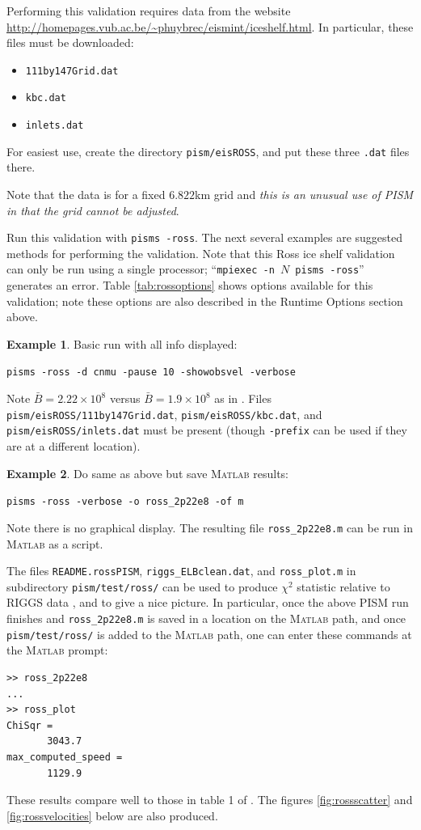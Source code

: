 \documentclass[11pt,final]{amsart}
\newcommand{\Matlab}{\textsc{Matlab}\xspace}
\begin{document}
Performing this validation requires data from the website \url{http://homepages.vub.ac.be/~phuybrec/eismint/iceshelf.html}.  In particular, these files must be downloaded:
\begin{itemize}
\item \verb|111by147Grid.dat|
\item \verb|kbc.dat|
\item \verb|inlets.dat|
\end{itemize}
For easiest use, create the directory \verb|pism/eisROSS|, and put these three \verb|.dat| files there.

Note that the data is for a fixed $6.822$km grid and \emph{this is an unusual use of PISM in that the grid cannot be adjusted}.

Run this validation with \verb|pisms -ross|.  The next several examples are suggested methods for performing the validation.  Note that this Ross ice shelf validation can only be run using a single processor; ``\verb|mpiexec -n |$N$\verb| pisms -ross|'' generates an error.  Table \ref{tab:rossoptions} shows options available for this validation; note these options are also described in the Runtime Options section above.

\bigskip
\noindent\textbf{Example 1}.  Basic run with all info displayed: 

\verb|pisms -ross -d cnmu -pause 10 -showobsvel -verbose|

\noindent Note $\bar B = 2.22 \times 10^8$ versus $\bar B = 1.9 \times 10^8$ as in \cite{MacAyealetal}.  Files \verb|pism/eisROSS/111by147Grid.dat|, \verb|pism/eisROSS/kbc.dat|, and \verb|pism/eisROSS/inlets.dat| must be present (though \verb|-prefix| can be used if they are at a different location).

\bigskip
\noindent\textbf{Example 2}.  Do same as above but save \Matlab results:

\verb|pisms -ross -verbose -o ross_2p22e8 -of m|

\noindent Note there is no graphical display.  The resulting file \verb|ross_2p22e8.m| can be run in \Matlab as a script.

The files \verb|README.rossPISM|, \verb|riggs_ELBclean.dat|, and \verb|ross_plot.m| in subdirectory \verb|pism/test/ross/| can be used to produce $\chi^2$ statistic relative to RIGGS data \cite{MacAyealetal}, and to give a nice picture.  In particular, once the above PISM run finishes and \verb|ross_2p22e8.m| is saved in a location on the \Matlab path, and once \verb|pism/test/ross/| is added to the \Matlab path, one can enter these commands at the \Matlab prompt:
\small\begin{verbatim}
>> ross_2p22e8
...
>> ross_plot
ChiSqr =
       3043.7
max_computed_speed =
       1129.9
\end{verbatim}
\normalsize
These results compare well to those in table 1 of \cite{MacAyealetal}.  The figures \ref{fig:rossscatter} and \ref{fig:rossvelocities} below are also produced.
\end{document}
